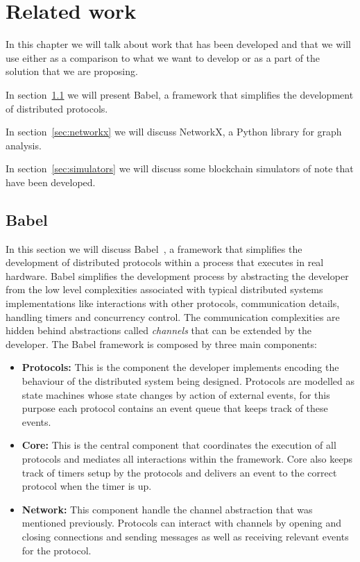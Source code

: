 
%

\chapter{Related work}\label{cha:related_work}

In this chapter we will talk about work that has been developed and that we will use
either as a comparison to what we want to develop or as a part of the solution that
we are proposing.

In section~\ref{sec:babel} we will present Babel, a framework that simplifies
the development of distributed protocols.

In section~\ref{sec:networkx} we will discuss NetworkX, a Python library
for graph analysis.

In section~\ref{sec:simulators} we will discuss some blockchain simulators of note that
have been developed.

\section{Babel}\label{sec:babel}

In this section we will discuss Babel~\cite{babel}, a framework that simplifies the
development of distributed protocols within a process that executes in real hardware.
Babel simplifies the development process by abstracting the developer from the
low level complexities associated with typical distributed systems implementations like
interactions with other protocols, communication details, handling timers and concurrency control.
The communication complexities are hidden behind abstractions called \textit{channels}
that can be extended by the developer. The Babel framework is composed by three main components:

\begin{itemize}
  \item \textbf{Protocols:} This is the component the developer implements encoding
the behaviour of the distributed system being designed. Protocols are modelled as
state machines whose state changes by action of external events, for this purpose
each protocol contains an event queue that keeps track of these events.
  \item \textbf{Core:} This is the central component that coordinates the
execution of all protocols and mediates all interactions within the framework.
Core also keeps track of timers setup by the protocols and delivers an event to the
correct protocol when the timer is up.
  \item \textbf{Network:} This component handle the channel abstraction that was
mentioned previously. Protocols can interact with channels by opening and closing connections
and sending messages as well as receiving relevant events for the protocol.
\end{itemize}

